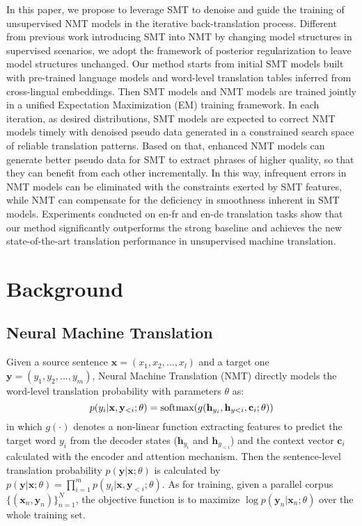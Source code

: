 \documentclass[letterpaper]{article} \usepackage{aaai19}  \usepackage{times}  \usepackage{helvet}  \usepackage{courier}  \usepackage{url}  \usepackage{graphicx}  \usepackage{amsmath}
\newcommand{\bx}{\mathbf{x}}
\newcommand{\by}{\mathbf{y}}
\begin{document}
In this paper, we propose to leverage SMT to denoise and guide the training of unsupervised NMT models in the iterative back-translation process. Different from previous work \cite{he2016improved,tang2016neural,wang2017neural} introducing SMT into NMT by changing model structures in supervised scenarios, we adopt the framework of posterior regularization \cite{ganchev2010posterior} to leave model structures unchanged. 
Our method starts from initial SMT models built with pre-trained language models and word-level translation tables inferred from cross-lingual embeddings. Then SMT models and NMT models are trained jointly in a unified Expectation Maximization (EM) training framework. 
In each iteration, as desired distributions, SMT models are expected to correct NMT models timely with denoised pseudo data generated in a constrained search space of reliable translation patterns. Based on that, enhanced NMT models can generate better pseudo data for SMT to extract phrases of higher quality, so that they can benefit from each other incrementally.
In this way, infrequent errors in NMT models can be eliminated with the constraints exerted by SMT features, while NMT can compensate for the deficiency in smoothness inherent in SMT models.
Experiments conducted on en-fr and en-de translation tasks show that our method significantly outperforms the strong baseline \cite{lample2018phrase} and achieves the new state-of-the-art translation performance in unsupervised machine translation.

\section{Background}
\subsection{Neural Machine Translation}
Given a source sentence $\bx=(x_1,x_2,...,x_l)$ and a target one $\by=(y_1,y_2,...,y_m)$, Neural Machine Translation (NMT) directly models the word-level translation probability with parameters $\theta$ as:
\begin{equation}
p(y_i|\bx,\by_{<i};\theta)=\textup{softmax}(g(\mathbf{h}_{y_i},\mathbf{h}_{y<i}, \mathbf{c}_{i};\theta))
\label{NMT_softmax}
\end{equation}
in which $g(\cdot)$ denotes a non-linear function extracting features to predict the target word $y_i$ from the decoder states ($\mathbf{h}_{y_i}$ and $\mathbf{h}_{y_{<i}}$)  
and the context vector $\mathbf{c}_{i}$ calculated with the encoder and attention mechanism. Then the sentence-level translation probability $p(\by|\bx;\theta)$ is calculated by $p(\by|\bx;\theta)=\prod_{i=1}^{m}p(y_i|\bx,\by_{<i};\theta)$. As for training, given a parallel corpus $\{(\bx_{n},\by_{n})\}_{n=1}^{N}$, the objective function is to maximize $\log p(\by_{n}|\bx_{n};\theta)$ over the whole training set.
\end{document}
